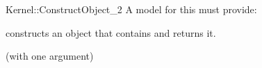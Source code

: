 \begin{ccRefFunctionObjectConcept}{Kernel::ConstructObject_2}
A model for this must provide:


{constructs an object that contains  and returns it.}

\ccRefines
{} (with one argument)

\ccSeeAlso
 \\
 \\
 \\
 \\
  \\

\end{ccRefFunctionObjectConcept}
